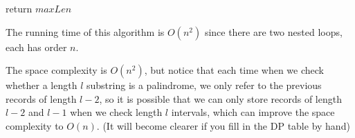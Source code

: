 \begin{spacing}{1.3}
\begin{algorithm*}[htbp]

        return $maxLen$
    \end{algorithm*}

    The running time of this algorithm is $O(n^2)$ since there are two nested loops, each 
    has order $n$. 
    
    The space complexity is $O(n^2)$, but notice that each time when we 
    check whether a length $l$ substring is a palindrome, we only refer to 
    the previous records of length $l-2$, so it is possible that we can only 
    store records of length $l-2$ and $l-1$ when we check length $l$ intervals,
    which can improve the space complexity to $O(n)$. (It will become 
    clearer if you fill in the DP table by hand)

\end{spacing}